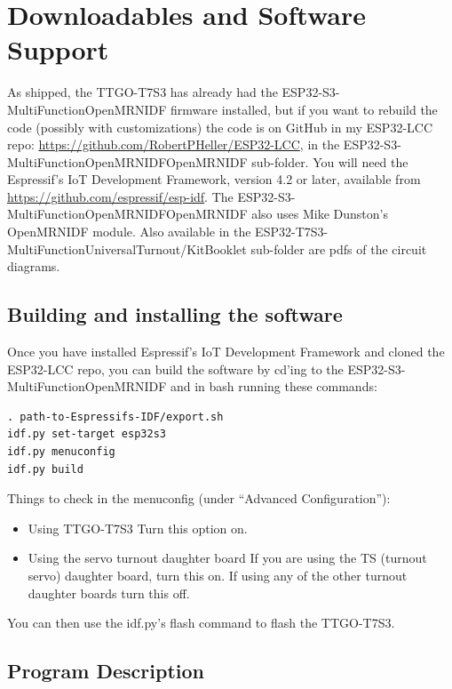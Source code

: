 \documentclass[12pt,twoside]{article}
\begin{document}

\clearpage
\section{Downloadables and Software Support}

As shipped, the TTGO-T7S3 has already had the ESP32-S3-MultiFunctionOpenMRNIDF
firmware installed, but if you want to rebuild the code (possibly with
customizations) the code is on GitHub in my ESP32-LCC repo:
\url{https://github.com/RobertPHeller/ESP32-LCC}, in the
ESP32-S3-MultiFunctionOpenMRNIDFOpenMRNIDF sub-folder. You will need the
Espressif's IoT Development Framework, version 4.2 or later, available from
\url{https://github.com/espressif/esp-idf}. The
ESP32-S3-MultiFunctionOpenMRNIDFOpenMRNIDF also uses Mike Dunston's OpenMRNIDF
module. Also available in the 
ESP32-T7S3-MultiFunctionUniversalTurnout/KitBooklet sub-folder are pdfs of the 
circuit diagrams.

\subsection{Building and installing the software}

Once you have installed Espressif's IoT Development Framework and cloned the 
ESP32-LCC repo, you can build the software by cd'ing to the 
ESP32-S3-MultiFunctionOpenMRNIDF and in bash running these commands:

\begin{verbatim}
. path-to-Espressifs-IDF/export.sh
idf.py set-target esp32s3
idf.py menuconfig
idf.py build
\end{verbatim}

Things to check in the menuconfig (under ``Advanced Configuration''):

\begin{itemize}
\item{Using TTGO-T7S3} Turn this option on.
\item{Using the servo turnout daughter board} If you are using the TS (turnout 
servo) daughter board, turn this on.  If using any of the other turnout 
daughter boards turn this off.
\end{itemize}

You can then use the idf.py's flash command to flash the TTGO-T7S3.

\subsection{Program Description}
\end{document}
